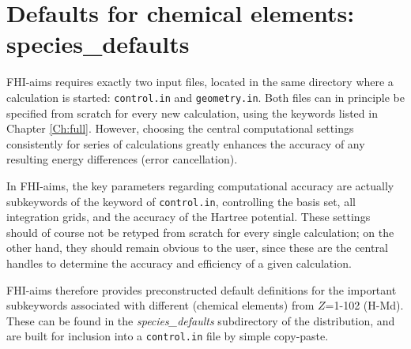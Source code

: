 \section{Defaults for chemical elements: species\_defaults}
\label{Sec:species}

FHI-aims requires exactly two input files, located in the same directory where
a calculation is started: \texttt{control.in} and \texttt{geometry.in}. Both
files can
in principle be specified from scratch for every new calculation, using the
keywords listed in Chapter \ref{Ch:full}. However, choosing the central
computational settings consistently for series of calculations greatly
enhances the accuracy of any resulting energy differences (error cancellation).

In FHI-aims, the key parameters regarding computational accuracy are actually
subkeywords of the  keyword of \texttt{control.in},
controlling the basis set, all integration grids, and the accuracy of the
Hartree potential. These settings should of course not be retyped from scratch
for every single calculation; on the other hand, they should remain obvious
to the user, since these are the central handles to determine the accuracy and
efficiency of a given calculation. 

FHI-aims therefore provides preconstructed default definitions for the
important subkeywords associated with different  (chemical
elements) from $Z$=1-102 (H-Md). These can be found in the
\emph{species\_defaults} subdirectory of the distribution, and are built for
inclusion into a \texttt{control.in} file by simple copy-paste. 

